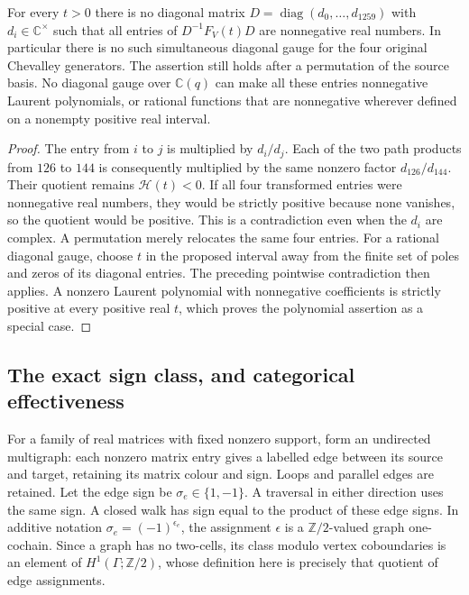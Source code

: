 \begin{theorem}\label{thm:positive-source-arbitrary-gauge}
For every $t>0$ there is no diagonal matrix
$D=\operatorname{diag}(d_0,\ldots,d_{1259})$ with
$d_i\in\mathbb C^\times$ such that all entries of
$D^{-1}F_V(t)D$ are nonnegative real numbers. In particular there is
no such simultaneous diagonal gauge for the four original Chevalley
generators. The assertion still holds after a permutation of the source
basis. No diagonal gauge over $\mathbb C(q)$ can make all these entries
nonnegative Laurent polynomials, or rational functions that are
nonnegative wherever defined on a nonempty positive real interval.
\end{theorem}
\begin{proof}
The entry from $i$ to $j$ is multiplied by $d_i/d_j$.
Each of the two path products from $126$ to $144$ is consequently
multiplied by the same nonzero factor $d_{126}/d_{144}$.
Their quotient remains $\mathcal H(t)<0$. If all four transformed
entries were nonnegative real numbers, they would be strictly positive
because none vanishes, so the quotient would be positive. This is a
contradiction even when the $d_i$ are complex. A permutation merely
relocates the same four entries. For a rational diagonal gauge, choose
$t$ in the proposed interval away from the finite set of poles and
zeros of its diagonal entries. The preceding pointwise contradiction
then applies. A nonzero Laurent polynomial with nonnegative
coefficients is strictly positive at every positive real $t$, which
proves the polynomial assertion as a special case.
\end{proof}

\subsection{The exact sign class, and categorical effectiveness}

For a family of real matrices with fixed nonzero support, form an
undirected multigraph: each nonzero matrix entry gives a labelled edge
between its source and target, retaining its matrix colour and sign.
Loops and parallel edges are retained. Let the edge sign be
$\sigma_e\in\{1,-1\}$. A traversal in either direction uses the same
sign. A closed walk has sign equal to the product of these edge signs.
In additive notation $\sigma_e=(-1)^{\epsilon_e}$, the assignment
$\epsilon$ is a $\mathbb Z/2$-valued graph one-cochain. Since a graph
has no two-cells, its class modulo vertex coboundaries is an element
of $H^1(\Gamma;\mathbb Z/2)$, whose definition here is precisely that
quotient of edge assignments.

